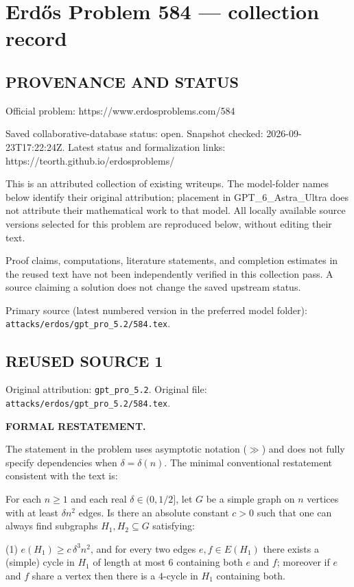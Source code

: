 \section*{Erd\H{o}s Problem 584 --- collection record}

\subsection*{PROVENANCE AND STATUS}
Official problem: https://www.erdosproblems.com/584

Saved collaborative-database status: open.
Snapshot checked: 2026-09-23T17:22:24Z.
Latest status and formalization links: https://teorth.github.io/erdosproblems/

This is an attributed collection of existing writeups. The model-folder names below identify their original attribution; placement in GPT\_6\_Astra\_Ultra does not attribute their mathematical work to that model. All locally available source versions selected for this problem are reproduced below, without editing their text.

Proof claims, computations, literature statements, and completion estimates in the reused text have not been independently verified in this collection pass. A source claiming a solution does not change the saved upstream status.

Primary source (latest numbered version in the preferred model folder): \texttt{attacks/erdos/gpt\_pro\_5.2/584.tex}.

\subsection*{REUSED SOURCE 1}
Original attribution: \texttt{gpt\_pro\_5.2}.
Original file: \texttt{attacks/erdos/gpt\_pro\_5.2/584.tex}.


\noindent\textbf{FORMAL RESTATEMENT.}

The statement in the problem uses asymptotic notation ($\gg$) and does not fully specify dependencies when $\delta=\delta(n)$.
The minimal conventional restatement consistent with the text is:

For each $n\ge 1$ and each real $\delta\in(0,1/2]$, let $G$ be a simple graph on $n$ vertices with at least $\delta n^2$ edges.
Is there an absolute constant $c>0$ such that one can always find subgraphs $H_1,H_2\subseteq G$ satisfying:

(1) $e(H_1)\ge c\,\delta^3 n^2$, and for every two edges $e,f\in E(H_1)$ there exists a (simple) cycle in $H_1$ of length at most $6$ containing both $e$ and $f$; moreover if $e$ and $f$ share a vertex then there is a $4$-cycle in $H_1$ containing both.

